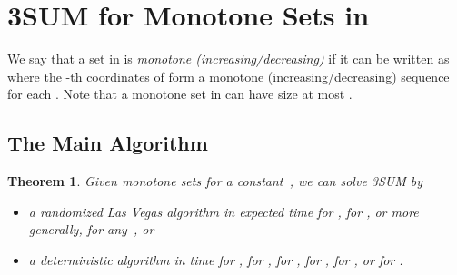 \documentclass[11pt]{article}
\newtheorem{theorem}{Theorem}[section]
\begin{document}
\section{3SUM for Monotone Sets in }\label{sec:mono}

We say that a set in  is \emph{monotone (increasing/decreasing)}
if it can be written as  where
the -th coordinates of
 form a monotone (increasing/decreasing) sequence
for each .
Note that a monotone set in  can have size at most .


\subsection{The Main Algorithm}

\begin{theorem}\label{thm-monotone}
Given monotone sets  for a constant~,
we can solve 3SUM by
\begin{itemize}
\item[\rm (i)] a randomized Las Vegas algorithm in expected time
 for ,
 for ,
or more generally,
 for any~, or
\item[\rm (ii)] a deterministic algorithm in time
 for ,
 for ,
 for ,
 for ,
 for ,
or  for .
\end{itemize}
\end{theorem}
\end{document}
